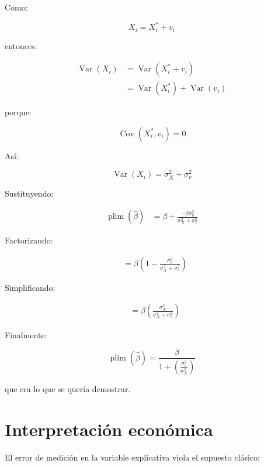 \documentclass[12pt,letterpaper]{article}
\newcommand{\Var}{\operatorname{Var}}
\newcommand{\Cov}{\operatorname{Cov}}
\newcommand{\plim}{\operatorname{plim}}
\begin{document}
Como:

\begin{equation}
X_i=X_i^{*}+v_i
\end{equation}

entonces:

\begin{align}
\Var(X_i)
&=
\Var(X_i^{*}+v_i) \\[4pt]
&=
\Var(X_i^{*})+\Var(v_i)
\end{align}

porque:

\begin{equation}
\Cov(X_i^{*},v_i)=0
\end{equation}

Así:

\begin{equation}
\Var(X_i)
=
\sigma_X^2+\sigma_v^2
\end{equation}

Sustituyendo:

\begin{align}
\plim(\hat{\beta})
&=
\beta
+
\frac{-\beta\sigma_v^2}
{\sigma_X^2+\sigma_v^2}
\end{align}

Factorizando:

\begin{align}
&=
\beta
\left(
1-
\frac{\sigma_v^2}
{\sigma_X^2+\sigma_v^2}
\right)
\end{align}

Simplificando:

\begin{align}
&=
\beta
\left(
\frac{\sigma_X^2}
{\sigma_X^2+\sigma_v^2}
\right)
\end{align}

Finalmente:

\begin{equation}
\boxed{
\plim(\hat{\beta})
=
\frac{\beta}
{1+\left(\frac{\sigma_v^2}{\sigma_X^2}\right)}
}
\end{equation}

que era lo que se quería demostrar.

\section{Interpretación económica}

El error de medición en la variable explicativa viola el supuesto clásico:
\end{document}
